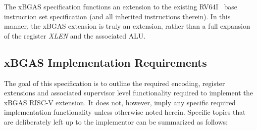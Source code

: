 \documentclass{article}
\begin{document}
The xBGAS specification functions an extension to the existing RV64I~\cite{RVSpec} 
base instruction set specification (and all inherited instructions therein).  In this 
manner, the xBGAS extension is truly an extension, rather than a full expansion 
of the register \textit{XLEN} and the associated ALU.

\subsection{xBGAS Implementation Requirements}

The goal of this specification is to outline the required encoding, register extensions 
and associated supervisor level functionality required to implement the xBGAS 
RISC-V extension.  It does not, however, imply any specific required implementation 
functionality unless otherwise noted herein.  Specific topics that are deliberately 
left up to the implementor can be summarized as follows:
\end{document}
